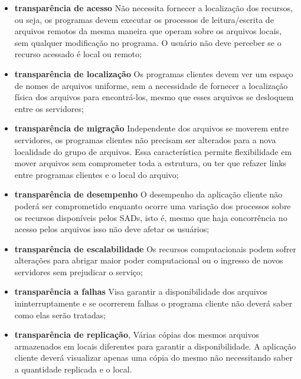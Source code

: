 	\begin{itemize}
		
	\item\textbf{transparência de acesso} Não necessita fornecer a localização dos recursos, ou seja, os programas devem executar os processos de leitura/escrita de arquivos remotos da mesma maneira que operam sobre os arquivos locais, sem qualquer modificação no programa. O usuário não deve perceber se o recurso acessado é local ou remoto;
	
	\item\textbf{transparência de localização} Os programas clientes devem ver um espaço de nomes de arquivos uniforme, sem a necessidade de fornecer a localização física dos arquivos para encontrá-los, mesmo que esses arquivos se desloquem entre os servidores;
	
	\item\textbf{transparência de migração} Independente dos arquivos se moverem entre servidores, os programas clientes não precisam ser alterados para a nova localidade do grupo de arquivos. Essa característica permite flexibilidade em mover arquivos sem comprometer toda a estrutura, ou ter que refazer links entre programas clientes e o local do arquivo;
	
	\item\textbf{transparência de desempenho} O desempenho da aplicação cliente não poderá ser comprometido enquanto ocorre uma variação dos processos sobre os recursos disponíveis pelos SADs, isto é, mesmo que haja concorrência no acesso pelos arquivos isso não deve afetar os usuários;
	
	\item\textbf{transparência de escalabilidade} Os recursos computacionais podem sofrer alterações para abrigar maior poder computacional ou o ingresso de novos servidores sem prejudicar o serviço;
	
	\item\textbf{transparência a falhas} Visa garantir a disponibilidade dos arquivos ininterruptamente e se ocorrerem falhas o programa cliente não deverá saber como elas serão tratadas;
	
	\item\textbf{transparência de replicação}, Várias cópias dos mesmos arquivos armazenados em locais diferentes para garantir a disponibilidade. A aplicação cliente deverá
	visualizar apenas uma cópia do mesmo não necessitando saber a quantidade replicada e o local.
	
	\end{itemize}
	
